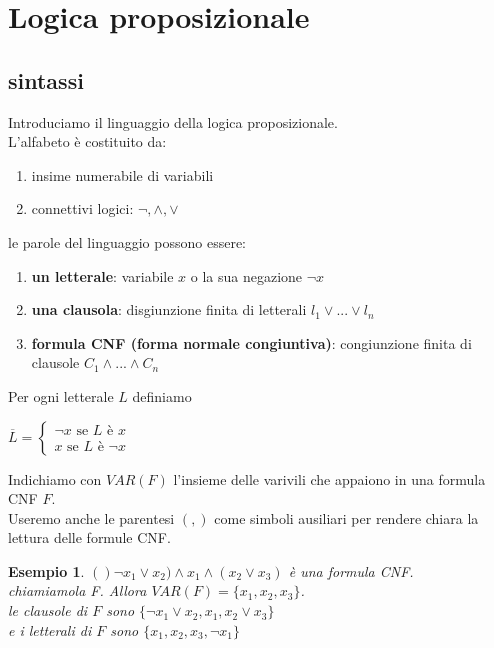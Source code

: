 \documentclass[a4paper,12pt]{article}
\theoremstyle{def}
\theoremstyle{prop}
\theoremstyle{esempio}
\newtheorem*{example}{Esempio}
\theoremstyle{dimostrazione}
\theoremstyle{teo}
\theoremstyle{osservazione}
\begin{document}
\newpage
\section{Logica proposizionale}
\subsection{sintassi}
Introduciamo il linguaggio della logica proposizionale.\\
L'alfabeto è costituito da:
\begin{enumerate}
	\item insime numerabile di variabili
	\item connettivi logici: \(\neg, \land, \lor\)
\end{enumerate}
le parole del linguaggio possono essere:
\begin{enumerate}
	\item \textbf{un letterale}: variabile \(x\) o la sua negazione \(\neg x\)
	\item \textbf{una clausola}: disgiunzione finita di letterali \(l_1 \lor ... \lor l_n\)
	\item \textbf{formula CNF (forma normale congiuntiva)}: congiunzione finita di clausole \(C_1 \land ... \land C_n\)
\end{enumerate}
Per ogni letterale \(L\) definiamo 
\begin{center}
	\(\overline{L} = \begin{cases}
		\neg x \text{ se } L \text{ è } x\\
		x \text{ se } L \text{ è } \neg x
	\end{cases}\)
\end{center}
Indichiamo con \(VAR(F)\) l'insieme delle varivili che appaiono in una formula CNF \(F\).\\
Useremo anche le parentesi \((,)\) come simboli ausiliari per rendere chiara la lettura delle formule CNF.\\
\begin{example}
	\(()\neg x_1 \lor x_2) \land x_1 \land (x_2 \lor x_3)\) è una formula CNF.\\
	chiamiamola F. Allora \(VAR(F)=\{x_1,x_2,x_3\}\).\\
	le clausole di \(F\) sono \(\{\neg x_1 \lor x_2, x_1, x_2 \lor x_3\}\)\\
	e i letterali di \(F\) sono \(\{x_1, x_2, x_3, \neg x_1 \}\)
\end{example}
\end{document}
